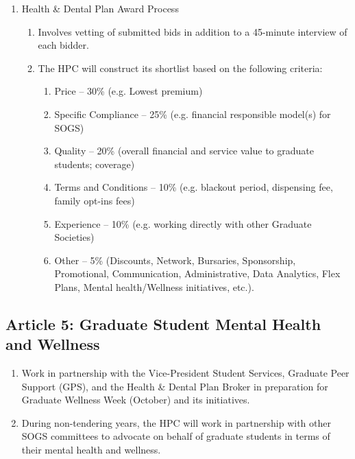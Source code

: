 \begin{enumerate} [label*=\arabic*., align=left]
\begin{enumerate}[label*=\arabic*., align=left]
\item Bidder Interviews. Fourth week of February. See archived documents.
\item Submit Shortlist to Council. Last Thursday of March (Council). See Bylaw 3.5.17.2.
\item Final Report to Council. Last Thursday of May (Council). See archived documents.
\end{enumerate}
\item Health \& Dental Plan Award Process
\begin{enumerate}[label*=\arabic*., align=left]	
\item Involves vetting of submitted bids in addition to a 45-minute interview of each bidder.
\item The HPC will construct its shortlist based on the following criteria:
\begin{enumerate}
\item Price -- 30\% (e.g. Lowest premium)
\item Specific Compliance -- 25\% (e.g. financial responsible model(s) for SOGS)
\item Quality -- 20\% (overall financial and service value to graduate students; coverage)
\item Terms and Conditions -- 10\% (e.g. blackout period, dispensing fee, family opt-ins
fees)
\item Experience -- 10\% (e.g. working directly with other Graduate Societies)
\item Other -- 5\% (Discounts, Network, Bursaries, Sponsorship, Promotional,
Communication, Administrative, Data Analytics, Flex Plans, Mental health/Wellness initiatives, etc.).
\end{enumerate}
\end{enumerate}
\end{enumerate}

\subsection{Article 5: Graduate Student Mental Health and Wellness}
\begin{enumerate}[label*=\arabic*., align=left]	
\item Work in partnership with the Vice-President Student Services, Graduate Peer Support (GPS), and the Health
\& Dental Plan Broker in preparation for Graduate Wellness Week (October) and its initiatives.
\item During non-tendering years, the HPC will work in partnership with other SOGS committees to advocate on
behalf of graduate students in terms of their mental health and wellness.
\end{enumerate}
